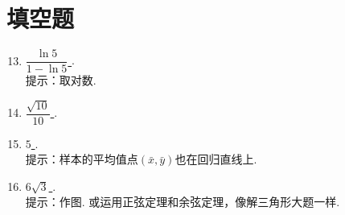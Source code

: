 \documentclass[11pt]{article}
\begin{document}
\section{\heiti 填空题}
\begin{enumerate}
	\setcounter{enumi}{12}
	\item \underline{\quad $ \dfrac{\ln 5}{1-\ln 5} $ \quad}.
	\\ 提示：取对数.
	\item \underline{\quad $ \dfrac{\sqrt{10}}{10} $ \quad}.
	\item \underline{\quad $ 5 $ \quad}.
	\\ 提示：样本的平均值点$ (\bar{x} ,\bar{y})  $也在回归直线上.
	\item \underline{\quad $ 6\sqrt{3}$ \quad}.
	\\ 提示：作图. 或运用正弦定理和余弦定理，像解三角形大题一样. 
\end{enumerate}
\end{document}
